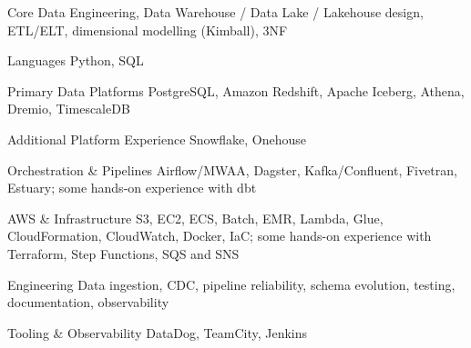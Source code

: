

\begin{cvskillsnoncentered}

  \cvskill
  {Core}
  {Data Engineering, Data Warehouse / Data Lake / Lakehouse design, ETL/ELT, dimensional modelling (Kimball), 3NF}

  \cvskill
  {Languages}
  {Python, SQL}

  \cvskill
  {Primary Data Platforms}
  {PostgreSQL, Amazon Redshift, Apache Iceberg, Athena, Dremio, TimescaleDB}

  \cvskill
  {Additional Platform Experience}
  {Snowflake, Onehouse}

  \cvskill
  {Orchestration \& Pipelines}
  {Airflow/MWAA, Dagster, Kafka/Confluent, Fivetran, Estuary; some hands-on experience with dbt}

  \cvskill
  {AWS \& Infrastructure}
  {S3, EC2, ECS, Batch, EMR, Lambda, Glue, CloudFormation, CloudWatch, Docker, IaC; some hands-on experience with Terraform, Step Functions, SQS and SNS}

  \cvskill
  {Engineering}
  {Data ingestion, CDC, pipeline reliability, schema evolution, testing, documentation, observability}

  \cvskill
  {Tooling \& Observability}
  {DataDog, TeamCity, Jenkins}
\end{cvskillsnoncentered}
